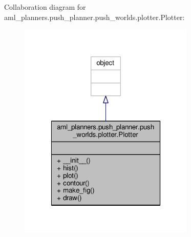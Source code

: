 Collaboration diagram for aml\-\_\-planners.\-push\-\_\-planner.\-push\-\_\-worlds.\-plotter.\-Plotter\-:\nopagebreak
\begin{figure}[H]
\begin{center}
\leavevmode
\includegraphics[width=238pt]{classaml__planners_1_1push__planner_1_1push__worlds_1_1plotter_1_1_plotter__coll__graph}
\end{center}
\end{figure}
